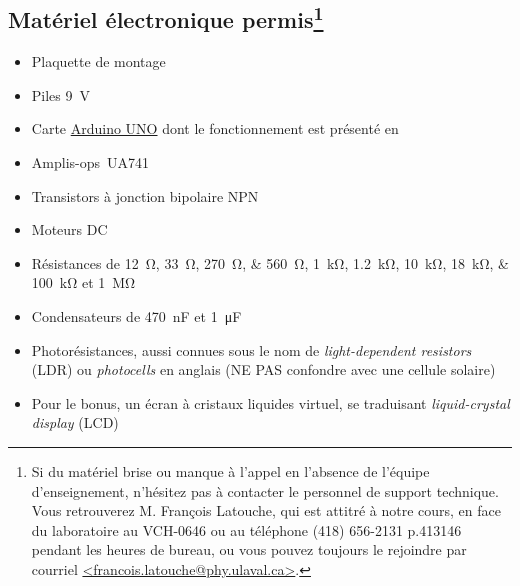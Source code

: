 \documentclass[english,french,12pt]{article}
\begin{document}
\subsection*{Matériel électronique permis\footnote{Si du matériel brise ou manque à l'appel en l'absence de l'équipe d'enseignement, n'hésitez pas à contacter le personnel de support technique. Vous retrouverez M. François Latouche, qui est attitré à notre cours, en face du laboratoire au VCH-0646 ou au téléphone (418) 656-2131 p.413146 pendant les heures de bureau, ou vous pouvez toujours le rejoindre par courriel \href{mailto:francois.latouche@phy.ulaval.ca}{ <francois.latouche@phy.ulaval.ca>}.}} 
\begin{itemize}
    \item Plaquette de montage
    \item Piles \SI{9}{\volt}
    \item Carte \href{https://www.arduino.cc/en/Guide/ArduinoUno}{Arduino UNO} dont le fonctionnement est présenté en 
    \item Amplis-ops~UA741
    \item Transistors à jonction bipolaire NPN
    \item Moteurs DC
    \item Résistances de \SIlist[list-final-separator = {, }]{12;33;270;560}{\ohm}, \SIlist[list-final-separator = {, }]{1;1.2;10; 18;100}{\kilo\ohm} et \SI{1}{\mega\ohm}
    \item Condensateurs de \SI{470}{\nano\farad} et \SI{1}{\micro\farad}
    \item Photorésistances, aussi connues sous le nom de \textit{light-dependent resistors} (LDR) ou \textit{photocells} en anglais (NE PAS confondre avec une cellule solaire)
    \item Pour le bonus, un écran à cristaux liquides virtuel, se traduisant \textit{liquid-crystal display} (LCD)
\end{itemize}
\end{document}
